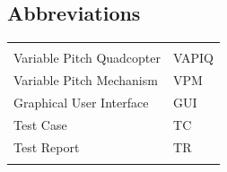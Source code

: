 \documentclass{article}
\begin{document}
\vspace*{0.5 cm}
\begin{center}
\section*{\textbf{Abbreviations}}
\begin{tabular}{ll}
\rowcolor{cadetgrey}
    &   \\
Variable Pitch Quadcopter & VAPIQ\\\rowcolor{gainsboro}
Variable Pitch Mechanism & VPM \\
Graphical User Interface & GUI \\ \rowcolor{gainsboro}
Test Case & TC \\
Test Report &TR \\ \rowcolor{gainsboro}

\end{tabular}                                                             
\end{center}


\newpage


\tableofcontents
\listoffigures
\listoftables
\newpage















\end{document}
